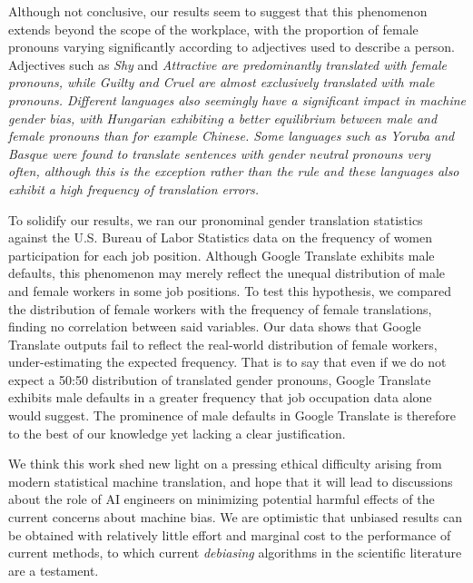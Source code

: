 \documentclass[fleqn,10pt]{article}
\begin{document}
Although not conclusive, our results seem to suggest that this phenomenon extends beyond the scope of the workplace, with the proportion of female pronouns varying significantly according to adjectives used to describe a person. Adjectives such as \emph{Shy} and \emph{Attractive are predominantly translated with female pronouns, while \emph{Guilty} and \emph{Cruel} are almost exclusively translated with male pronouns. Different languages also seemingly have a significant impact in machine gender bias, with Hungarian exhibiting a better equilibrium between male and female pronouns than for example Chinese. Some languages such as Yoruba and Basque were found to translate sentences with gender neutral pronouns very often, although this is the exception rather than the rule and these languages also exhibit a high frequency of translation errors.}

To solidify our results, we ran our pronominal gender translation statistics against the U.S. Bureau of Labor Statistics data on the frequency of women participation for each job position. Although Google Translate exhibits male defaults, this phenomenon may merely reflect the unequal distribution of male and female workers in some job positions. To test this hypothesis, we compared the distribution of female workers with the frequency of female translations, finding no correlation between said variables. Our data shows that Google Translate outputs fail to reflect the real-world distribution of female workers, under-estimating the expected frequency. That is to say that even if we do not expect a 50:50 distribution of translated gender pronouns, Google Translate exhibits male defaults in a greater frequency that job occupation data alone would suggest. The prominence of male defaults in Google Translate is therefore to the best of our knowledge yet lacking a clear justification.

We think this work shed new light on a  pressing ethical difficulty arising from modern statistical machine translation, and hope that it will lead to discussions about the role of AI engineers on minimizing potential harmful effects of the current concerns about machine bias. We are optimistic that unbiased results can be obtained with relatively little effort and marginal cost to the performance of current methods, to which current \emph{debiasing} algorithms in the scientific literature are a testament.
\end{document}
